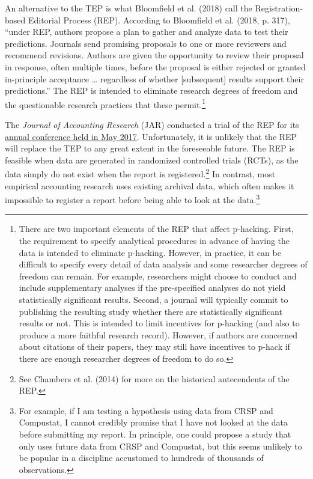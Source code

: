 \documentclass[
  letterpaper,
  DIV=11,
  numbers=noendperiod]{scrartcl}
\begin{document}
An alternative to the TEP is what Bloomfield et al. (2018) call the
Registration-based Editorial Process (REP). According to Bloomfield et
al. (2018, p. 317), ``under REP, authors propose a plan to gather and
analyze data to test their predictions. Journals send promising
proposals to one or more reviewers and recommend revisions. Authors are
given the opportunity to review their proposal in response, often
multiple times, before the proposal is either rejected or granted
in-principle acceptance \ldots{} regardless of whether {[}subsequent{]}
results support their predictions.'' The REP is intended to eliminate
research degrees of freedom and the questionable research practices that
these permit.\footnote{There are two important elements of the REP that
  affect p-hacking. First, the requirement to specify analytical
  procedures in advance of having the data is intended to eliminate
  p-hacking. However, in practice, it can be difficult to specify every
  detail of data analysis and some researcher degrees of freedom can
  remain. For example, researchers might choose to conduct and include
  supplementary analyses if the pre-specified analyses do not yield
  statistically significant results. Second, a journal will typically
  commit to publishing the resulting study whether there are
  statistically significant results or not. This is intended to limit
  incentives for p-hacking (and also to produce a more faithful research
  record). However, if authors are concerned about citations of their
  papers, they may still have incentives to p-hack if there are enough
  researcher degrees of freedom to do so.}

The \emph{Journal of Accounting Research} (JAR) conducted a trial of the
REP for its
\href{https://research.chicagobooth.edu/arc/journal-of-accounting-research/jar-annual-conference/conference-web-casts/2017}{annual
conference held in May 2017}. Unfortunately, it is unlikely that the REP
will replace the TEP to any great extent in the foreseeable future. The
REP is feasible when data are generated in randomized controlled trials
(RCTs), as the data simply do not exist when the report is
registered.\footnote{See Chambers et al. (2014) for more on the
  historical antecendents of the REP.} In contrast, most empirical
accounting research uses existing archival data, which often makes it
impossible to register a report before being able to look at the
data.\footnote{For example, if I am testing a hypothesis using data from
  CRSP and Compustat, I cannot credibly promise that I have not looked
  at the data before submitting my report. In principle, one could
  propose a study that only uses future data from CRSP and Compustat,
  but this seems unlikely to be popular in a discipline accustomed to
  hundreds of thousands of observations.}
\end{document}
